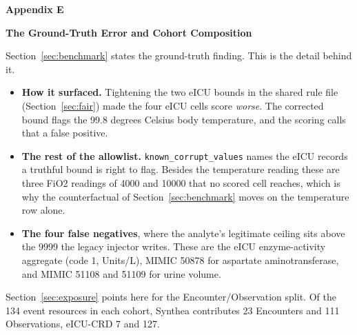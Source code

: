 \FloatBarrier
\newpage
{}
{}
{\centering\normalfont\bfseries\large Appendix E\par}
{\centering\normalfont\bfseries\large The Ground-Truth Error and Cohort Composition\par}
\nopagebreak

Section~\ref{sec:benchmark} states the ground-truth finding. This is the detail behind it.

\begin{itemize}[leftmargin=1.4em, itemsep=0.15em]
  \item \textbf{How it surfaced.} Tightening the two eICU bounds in the shared rule file
        (Section~\ref{sec:fair}) made the four eICU cells score \emph{worse}. The corrected bound
        flags the 99.8 degrees Celsius body temperature, and the scoring calls that a false
        positive.
  \item \textbf{The rest of the allowlist.} \texttt{known\_corrupt\_values} names the eICU records a
        truthful bound is right to flag. Besides the temperature reading these are three FiO2
        readings of 4000 and 10000 that no scored cell reaches, which is why the counterfactual of
        Section~\ref{sec:benchmark} moves on the temperature row alone.
  \item \textbf{The four false negatives}, where the analyte's legitimate ceiling sits above the
        9999 the legacy injector writes. These are the eICU enzyme-activity aggregate (code 1,
        Units/L), MIMIC 50878 for aspartate aminotransferase, and MIMIC 51108 and 51109 for urine
        volume.
\end{itemize}

Section~\ref{sec:exposure} points here for the Encounter/Observation split. Of the 134 event
resources in each cohort, Synthea contributes 23 Encounters and 111 Observations, eICU-CRD 7 and
127.
